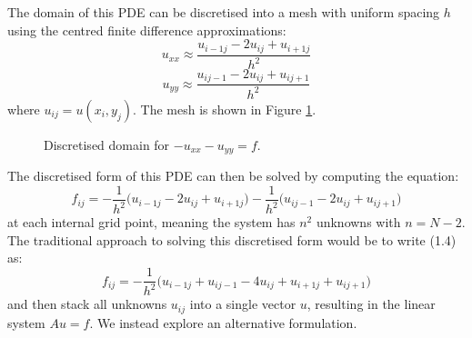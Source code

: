 \documentclass[11pt]{article}
\numberwithin{equation}{section}
\begin{document}
The domain of this PDE can be discretised into a mesh with uniform spacing $h$ using the centred finite difference approximations:
	\begin{equation} 
	u_{xx} \approx \frac{u_{i-1j} - 2u_{ij} + u_{i+1j}}{h^2}
	\end{equation}
	\begin{equation}
	u_{yy} \approx \frac{u_{ij-1} - 2u_{ij} + u_{ij+1}}{h^2}
	\end{equation}
where $u_{ij} = u(x_i, y_j)$. The mesh is shown in Figure \ref{fig:domain2}.

\begin{figure}[H]
\centering
\caption{Discretised domain for $-u_{xx}-u_{yy}=f$.}
\label{fig:domain2}
\end{figure}

The discretised form of this PDE can then be solved by computing the equation:
	\begin{equation}
	f_{ij} = -\frac{1}{h^2} \big( u_{i-1j} - 2u_{ij} + u_{i+1j} \big) - \frac{1}{h^2} \big( u_{ij-1} - 2u_{ij} + u_{ij+1} \big)
	\end{equation}
at each internal grid point, meaning the system has $n^2$ unknowns with $n=N-2$. The traditional approach to solving this discretised form would be to write (1.4) as:
	\begin{equation}
	f_{ij} = -\frac{1}{h^2} \big( u_{i-1j} + u_{ij-1} - 4u_{ij} + u_{i+1j} + u_{ij+1}  \big)
	\end{equation}
and then stack all unknowns $u_{ij}$ into a single vector $u$, resulting in the linear system $Au=f$. We instead explore an alternative formulation.
\end{document}
